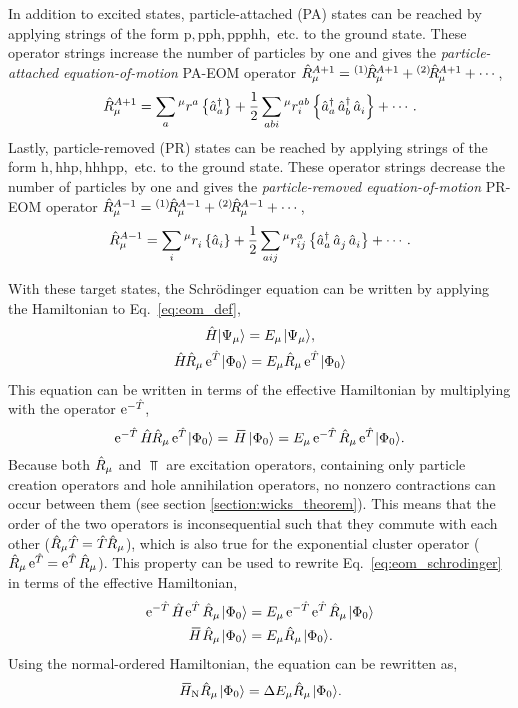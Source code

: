\documentclass[thesis.tex]{subfiles}
\begin{document}
In addition to excited states, particle-attached (PA) states can be reached by applying strings of the form $\mathrm{p,pph,ppphh,}$ etc. to the ground state.  These operator strings increase the number of particles by one and gives the \textit{particle-attached equation-of-motion} PA-EOM operator $\hat{R}\hspace{-0.1pt}^{A+1}_{\mu} = {}^{\left(1\right)}\hspace{-2pt}\hat{R}\hspace{-0.5pt}^{A+1}_{\mu} + {}^{\left(2\right)}\hspace{-2pt}\hat{R}\hspace{-0.5pt}^{A+1}_{\mu} + \cdots $,
\begin{equation}
  \hat{R}\hspace{-0.1pt}^{A+1}_{\mu} = \sum_{a}{}^{\mu}r^{a}_{}\left\{\mathop{\hat{a}^{\dagger}_{a}}\right\} + \frac{1}{2}\sum_{abi}{}^{\mu}r^{ab}_{i}\left\{\mathop{\hat{a}^{\dagger}_{a}}\mathop{\hat{a}^{\dagger}_{b}}\mathop{\hat{a}^{}_{i}}\right\} + \cdots.
\end{equation}
Lastly, particle-removed (PR) states can be reached by applying strings of the form $\mathrm{h,hhp,hhhpp,}$ etc. to the ground state.  These operator strings decrease the number of particles by one and gives the \textit{particle-removed equation-of-motion} PR-EOM operator $\hat{R}\hspace{-0.1pt}^{A-1}_{\mu} = {}^{\left(1\right)}\hspace{-2pt}\hat{R}\hspace{-0.5pt}^{A-1}_{\mu} + {}^{\left(2\right)}\hspace{-2pt}\hat{R}\hspace{-0.5pt}^{A-1}_{\mu} + \cdots $,
\begin{equation}
  \hat{R}\hspace{-0.1pt}^{A-1}_{\mu} = \sum_{i}{}^{\mu}r^{}_{i}\left\{\mathop{\hat{a}^{}_{i}}\right\} + \frac{1}{2}\sum_{aij}{}^{\mu}r^{a}_{ij}\left\{\mathop{\hat{a}^{\dagger}_{a}}\mathop{\hat{a}^{}_{j}}\mathop{\hat{a}^{}_{i}}\right\} + \cdots.
\end{equation}

With these target states, the Schr\"odinger equation can be written by applying the Hamiltonian to Eq.\ \eqref{eq:eom_def},
\begin{gather}
  \Ham\ket{\Psi_{\mu}} = E_{\mu}\ket{\Psi_{\mu}}, \notag \\
  \Ham\Rop_{\mu}\E^{\Top}\refket = E_{\mu}\Rop_{\mu}\E^{\Top}\refket
\end{gather}
This equation can be written in terms of the effective Hamiltonian by multiplying with the operator $\operatorname{e}^{-\hat{T}\hspace{-0.25pt}}$,
\begin{equation} \label{eq:eom_schrodinger}
  \E^{-\Top}\Ham\Rop_{\mu}\E^{\Top}\refket = \EHam\refket = E_{\mu}\E^{-\Top}\Rop_{\mu}\E^{\Top}\refket.
\end{equation}
Because both $\hat{R}\hspace{-0.1pt}_{\mu}$ and $\Top$ are excitation operators, containing only particle creation operators and hole annihilation operators, no nonzero contractions can occur between them (see section \ref{section:wicks_theorem}).  This means that the order of the two operators is inconsequential such that they commute with each other ($\hat{R}\hspace{-0.1pt}_{\mu}\hat{T}\hspace{-0.25pt} = \hat{T}\hspace{-0.25pt}\hat{R}\hspace{-0.1pt}_{\mu}$), which is also true for the exponential cluster operator ($\hat{R}\hspace{-0.1pt}_{\mu}\operatorname{e}^{\hat{T}\hspace{-0.25pt}} = \operatorname{e}^{\hat{T}\hspace{-0.25pt}}\hat{R}\hspace{-0.1pt}_{\mu}$).  This property can be used to rewrite Eq.\ \eqref{eq:eom_schrodinger} in terms of the effective Hamiltonian,
\begin{align} \label{eq:eom_schrodinger1}
  \E^{-\Top}\Ham\E^{\Top}\Rop_{\mu}\refket &= E_{\mu}\E^{-\Top}\E^{\Top}\Rop_{\mu}\refket \notag \\
  \EHam\Rop_{\mu}\refket &= E_{\mu}\Rop_{\mu}\refket.
\end{align}
Using the normal-ordered Hamiltonian, the equation can be rewritten as,
\begin{equation} \label{eq:eom_schrodinger2}
  \EHamN\Rop_{\mu}\refket = \Ecorr_{\mu}\Rop_{\mu}\refket.
\end{equation}
\end{document}
